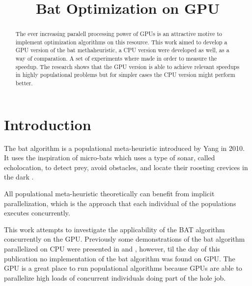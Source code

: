 \documentclass[conference]{IEEEtran}
\begin{document}
\title{Bat Optimization on GPU}

\author{
\and
{}
}

\maketitle
\begin{abstract}
The ever increasing paralell processing power of GPUs is an attractive
motive to implement optimization algorithms on this resource. This work
aimed to develop a GPU version of the bat methaheuristic, a CPU version
were developed as well, as a way of comparation. A set of experiments where
made in order to measure the speedup. The research shows that the GPU
version is able to achieve relevant speedups in highly populational
problems but for simpler cases the CPU version might perform better.
\end{abstract}
\IEEEpeerreviewmaketitle

\section{Introduction}

The bat algorithm is a populational meta-heuristic introduced by Yang in
2010. It uses the inspiration of micro-bats which uses a type of sonar,
called echolocation, to detect prey, avoid obstacles, and locate their
roosting crevices in the dark \cite{original}.

All populational meta-heuristic theoretically can benefit from implicit
parallelization, which is the approach that each individual of the
populations executes concurrently.

This work attempts to investigate the applicability of the BAT algorithm
concurrently on the GPU. Previously some demonstrations of the bat
algorithm parallelized on CPU were presented in \cite{paralellCPUFirst}
and \cite{paralellCPU}, however, til the day of this publication no
implementation of the bat algorithm was found on GPU. The GPU is a
great place to run populational algorithms because GPUs are able to
parallelize high loads of concurrent individuals doing part of the hole
job.
\end{document}
